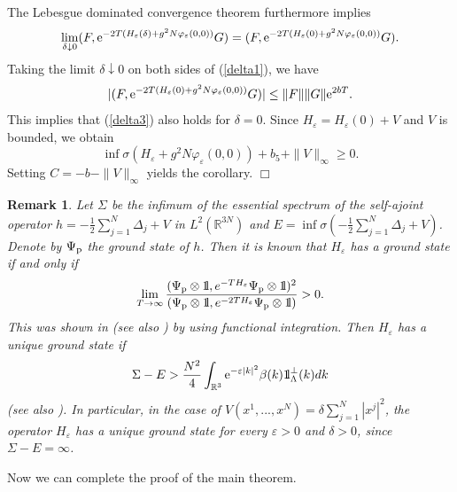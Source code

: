 \documentclass[12pt]{article}
\newtheorem{remark}[theorem]{Remark}
\newcommand{\br}[1]{\begin{remark}\label{#1}}
\newcommand{\er}{\end{remark}}
\def\bbbone{{\mathchoice {\rm 1\mskip-4mu l} {\rm 1\mskip-4mu l}
{\rm 1\mskip-4.5mu l} {\rm 1\mskip-5mu l}}}
\def\one{\bbbone}
\newcommand{\kp}{\one_\Lambda^\perp(k)}
\providecommand{\eq}[1]{\begin{equation}\label{#1}}
\providecommand{\en}{\end{equation}}
\renewcommand{\d}{\displaystyle}
\providecommand{\qed}{\hfill {$\Box$}\par\medskip}
\providecommand{\BR}{{\mathbb{R}^3 }}
\providecommand{\RR}{\mathbb{R}}
\providecommand{\kak}[1]{(\ref{#1})}
\providecommand{\is}{\inf \s}
\providecommand{\grp}{\Psi_{\rm p}}
\providecommand{\half}{\frac{1}{2}}
\providecommand{\s}{\sigma}
\providecommand{\e}{{\rm e}}
\providecommand{\1}{\mathbb{1}}
\providecommand {\s}  {\ensuremath {\mathcal{S}}}
\providecommand{\eps}{\varepsilon}
\begin{document}
The Lebesgue dominated convergence theorem furthermore implies
$$
\lim_{\delta\downarrow 0}(F, \e^{-2T(H_\eps(\delta)+g^2 N\varphi_\eps(0,0))}G)
= (F, \e^{-2T(H_\eps(0)+g^2 N\varphi_\eps(0,0))}G).
$$
Taking the limit $\delta\downarrow 0$ on both sides of \kak{delta1}, we have
\eq{delta2}
|(F, \e^{-2T(H_\eps(0)+g^2 N\varphi_\eps(0,0))}G)|\leq \|F\| \|G\| \e^{2 b T}.
\en
This implies that  \kak{delta3} also holds for $\delta=0$. Since $H_\eps=H_\eps(0)+V$ and $V$
is bounded, we obtain
$$
\is(H_\eps+g^2 N\varphi_\eps(0,0))+{b_5}+\|V\|_\infty \geq0.
$$
Setting $C=-{b}-\|V\|_\infty$ yields the corollary.
\qed
\br{existence}
\rm{
Let $\Sigma$ be the infimum of the essential spectrum of the self-ajoint operator $h=-\half \sum_{j=1}^N
\Delta_j +V$ in $L^2(\RR^{3N})$ and $E=\is(-\half\sum_{j=1}^N  \Delta_j +V)$. Denote by $\grp$ the ground 
state of $h$. Then it is known that $H_\eps$ has a ground state if and only if
$$
\d \lim_{T\to\infty}\frac{(\grp\otimes\one, e^{-TH_\eps}\grp\otimes\one)^2}{(\grp\otimes\one, 
e^{-2TH_\eps}\grp\otimes\one)}>0.
$$
This was shown in \cite{spo98} (see also \cite[Section~6]{lhb11}) by using functional integration. Then
$H_\eps$ has a unique ground state if
$$
\Sigma-E>\frac{N^2}{4} \int_\BR \e^{-\eps|k|^2}\beta(k) \kp dk
$$
(see also \cite[Theorem 6.6]{lhb11}). In particular, in the case of $V(x^1,...,x^N)=\delta \sum_{j=1}^N
|x^j|^2$, the operator $H_\eps$ has a unique ground state for every $\eps>0$ and $\delta>0$, since
$\Sigma-E=\infty$.
}
\er

Now we can complete the proof of the main theorem.
\end{document}
